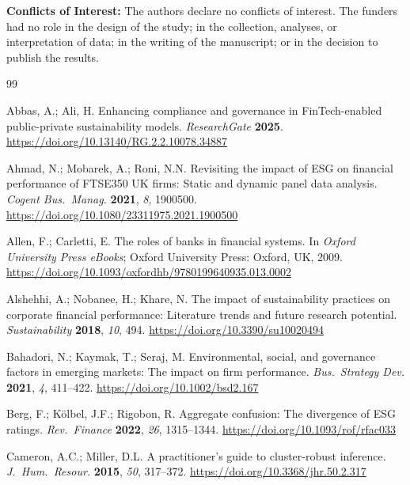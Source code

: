 \documentclass[12pt]{article}
\begin{document}
\medskip
\noindent\textbf{Conflicts of Interest:} The authors declare no conflicts of interest. The funders had no role in the design of the study; in the collection, analyses, or interpretation of data; in the writing of the manuscript; or in the decision to publish the results.

\begin{thebibliography}{99}\setlength{\itemsep}{2pt}

Abbas, A.; Ali, H. Enhancing compliance and governance in FinTech-enabled public-private sustainability models. \textit{ResearchGate} \textbf{2025}. \url{https://doi.org/10.13140/RG.2.2.10078.34887}

Ahmad, N.; Mobarek, A.; Roni, N.N. Revisiting the impact of ESG on financial performance of FTSE350 UK firms: Static and dynamic panel data analysis. \textit{Cogent Bus.\ Manag.} \textbf{2021}, \textit{8}, 1900500. \url{https://doi.org/10.1080/23311975.2021.1900500}

Allen, F.; Carletti, E. The roles of banks in financial systems. In \textit{Oxford University Press eBooks}; Oxford University Press: Oxford, UK, 2009. \url{https://doi.org/10.1093/oxfordhb/9780199640935.013.0002}

Alshehhi, A.; Nobanee, H.; Khare, N. The impact of sustainability practices on corporate financial performance: Literature trends and future research potential. \textit{Sustainability} \textbf{2018}, \textit{10}, 494. \url{https://doi.org/10.3390/su10020494}

Bahadori, N.; Kaymak, T.; Seraj, M. Environmental, social, and governance factors in emerging markets: The impact on firm performance. \textit{Bus.\ Strategy Dev.} \textbf{2021}, \textit{4}, 411--422. \url{https://doi.org/10.1002/bsd2.167}

Berg, F.; Kölbel, J.F.; Rigobon, R. Aggregate confusion: The divergence of ESG ratings. \textit{Rev.\ Finance} \textbf{2022}, \textit{26}, 1315--1344. \url{https://doi.org/10.1093/rof/rfac033}

Cameron, A.C.; Miller, D.L. A practitioner's guide to cluster-robust inference. \textit{J.~Hum.\ Resour.} \textbf{2015}, \textit{50}, 317--372. \url{https://doi.org/10.3368/jhr.50.2.317}


\end{thebibliography}
\end{document}
